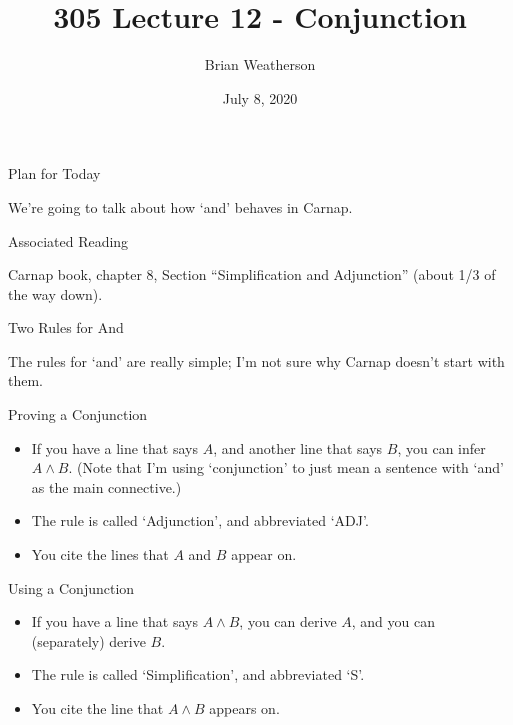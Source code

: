 \documentclass[
  ignorenonframetext,
]{beamer}
\title{305 Lecture 12 - Conjunction}
\author{Brian Weatherson}
\date{July 8, 2020}
\providecommand{\tightlist}{%
  \setlength{\itemsep}{0pt}\setlength{\parskip}{0pt}}
\renewcommand{\,}{\text{, }}
\begin{document}
\frame{\titlepage}

\begin{frame}{Plan for Today}
\protect\hypertarget{plan-for-today}{}

We're going to talk about how `and' behaves in Carnap.

\end{frame}

\begin{frame}{Associated Reading}
\protect\hypertarget{associated-reading}{}

Carnap book, chapter 8, Section ``Simplification and Adjunction'' (about
1/3 of the way down).

\end{frame}

\begin{frame}{Two Rules for And}
\protect\hypertarget{two-rules-for-and}{}

The rules for `and' are really simple; I'm not sure why Carnap doesn't
start with them.

\end{frame}

\begin{frame}{Proving a Conjunction}
\protect\hypertarget{proving-a-conjunction}{}

\begin{itemize}
\tightlist
\item
  If you have a line that says \(A\), and another line that says \(B\),
  you can infer \(A \wedge B\). (Note that I'm using `conjunction' to
  just mean a sentence with `and' as the main connective.)
\item
  The rule is called `Adjunction', and abbreviated `ADJ'.
\item
  You cite the lines that \(A\) and \(B\) appear on.
\end{itemize}

\end{frame}

\begin{frame}{Using a Conjunction}
\protect\hypertarget{using-a-conjunction}{}

\begin{itemize}
\tightlist
\item
  If you have a line that says \(A \wedge B\), you can derive \(A\), and
  you can (separately) derive \(B\).
\item
  The rule is called `Simplification', and abbreviated `S'.
\item
  You cite the line that \(A \wedge B\) appears on.
\end{itemize}

\end{frame}
\end{document}

